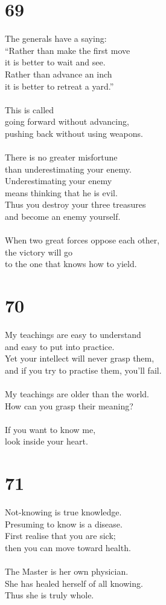 \documentclass[b5paper, 12pt, oneside]{book}
\begin{document}
\chapter*{69}
The generals have a saying:\\
``Rather than make the first move\\
it is better to wait and see.\\
Rather than advance an inch\\
it is better to retreat a yard.''\\
\\
This is called\\
going forward without advancing,\\
pushing back without using weapons.\\
\\
There is no greater misfortune\\
than underestimating your enemy.\\
Underestimating your enemy\\
means thinking that he is evil.\\
Thus you destroy your three treasures\\
and become an enemy yourself.\\
\\
When two great forces oppose each other,\\
the victory will go\\
to the one that knows how to yield.

\chapter*{70}
My teachings are easy to understand\\
and easy to put into practice.\\
Yet your intellect will never grasp them,\\
and if you try to practise them, you'll fail.\\
\\
My teachings are older than the world.\\
How can you grasp their meaning?\\
\\
If you want to know me,\\
look inside your heart.

\chapter*{71}
Not-knowing is true knowledge.\\
Presuming to know is a disease.\\
First realise that you are sick;\\
then you can move toward health.\\
\\
The Master is her own physician.\\
She has healed herself of all knowing.\\
Thus she is truly whole.
\end{document}
